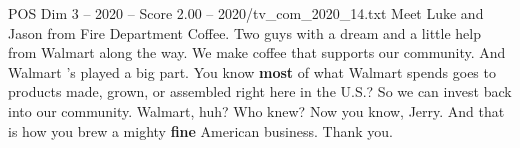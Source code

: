 \begin{textsample}{POS Dim 3 – 2020 – Score 2.00 – 2020/tv\_com\_2020\_14.txt}  \label{ex:f3_pos_067}
Meet Luke and Jason from Fire Department Coffee.
Two guys with a dream and a little help from Walmart along the way.
We make coffee that supports our community.
And Walmart 's played a big part.
You know \textbf{most} of what Walmart spends goes to products made, grown, or assembled right here in the U.S.?
So we can invest back into our community.
Walmart, huh?
Who knew?
Now you know, Jerry.
And that is how you brew a mighty \textbf{fine} American business.
Thank you.

\end{textsample}
